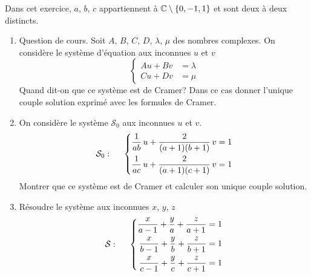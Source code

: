 Dans cet exercice, $a$, $b$, $c$ appartiennent à $\mathbb{C}\setminus\left\lbrace 0, -1, 1\right\rbrace$ et sont deux à deux distincts.
\begin{enumerate}
  \item Question de cours.\newline
  Soit $A$, $B$, $C$, $D$, $\lambda$, $\mu$ des nombres complexes. On considère le système d'équation aux inconnues $u$ et $v$
\begin{displaymath}
  \left\lbrace 
  \begin{aligned}
    Au + Bv &= \lambda \\ Cu + Dv &=\mu
  \end{aligned}
  \right. 
\end{displaymath}
Quand dit-on que ce système est de Cramer? Dans ce cas donner l'unique couple solution exprimé avec les formules de Cramer.

  \item On considère le système $\mathcal{S}_0$ aux inconnues $u$ et $v$.
\begin{displaymath}
\mathcal{S}_0:\hspace{0.5cm}
\left\lbrace 
\begin{aligned}
  \frac{1}{ab}\,u + \frac{2}{(a+1)(b+1)}\,v &=1\\
  \frac{1}{ac}\,u + \frac{2}{(a+1)(c+1)}\,v &=1
  \end{aligned}
\right.   
\end{displaymath}
Montrer que ce système est de Cramer et calculer son unique couple solution.

\item Résoudre le système aux inconnues $x$, $y$, $z$
\begin{displaymath}
\mathcal{S}:\hspace{0.5cm}
\left\lbrace
\begin{aligned}
  \frac{x}{a-1} + \frac{y}{a} + \frac{z}{a+1} &= 1 \\ 
  \frac{x}{b-1} + \frac{y}{b} + \frac{z}{b+1} &= 1 \\
  \frac{x}{c-1} + \frac{y}{c} + \frac{z}{c+1} &= 1 
\end{aligned}
\right. 
\end{displaymath}

\end{enumerate}
